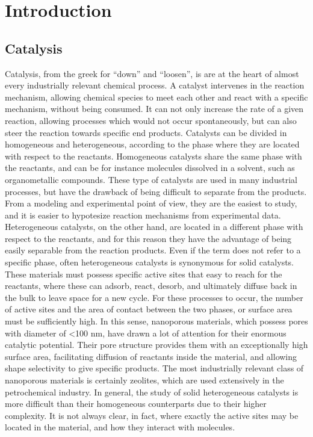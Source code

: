 \graphicspath{{figures/}}

\renewcommand\evenpagerightmark{{\scshape\small Introduction}}
\renewcommand\oddpageleftmark{{\scshape\small Chapter 1}}


\hyphenation{}

\chapter[Introduction]%
{Introduction}
\label{ch1}
\section{Catalysis}
Catalysis, from the greek for ``down'' and ``loosen'', is are at the heart of almost every industrially relevant chemical process. A catalyst intervenes in the reaction mechanism, allowing chemical species to meet each other and react with a specific mechanism, without being consumed. It can not only increase the rate of a given reaction, allowing processes which would not occur spontaneously, but can also steer the reaction towards specific end products. Catalysts can be divided in homogeneous and heterogeneous, according to the phase where they are located with respect to the reactants. Homogeneous catalysts share the same phase with the reactants, and can be for instance molecules dissolved in a solvent, such as organometallic compounds. These type of catalysts are used in many industrial processes,  but have the drawback of being difficult to separate from the products. From a modeling and experimental point of view, they are the easiest to study, and it is easier to hypotesize reaction mechanisms from experimental data. Heterogeneous catalysts, on the other hand, are located in a different phase with respect to the reactants, and for this reason they have the advantage of being easily separable from the reaction products. Even if the term does not refer to a specific phase, often heterogeneous catalysts is synonymous for solid catalysts. These materials must possess specific active sites that easy to reach for the reactants, where these can adsorb, react, desorb, and ultimately diffuse back in the bulk to leave space for a new cycle. For these processes to occur, the number of active sites and the area of contact between the two phases, or surface area must be sufficiently high. In this sense, nanoporous materials, which possess pores with diameter of <100 nm, have drawn a lot of attention for their enormous catalytic potential. Their pore structure provides them with an exceptionally high surface area, facilitating diffusion of reactants inside the material, and allowing shape selectivity to give specific products. The most industrially relevant class of nanoporous materials is certainly zeolites, which are used extensively in the petrochemical industry. In general, the study of solid heterogeneous catalysts is more difficult than their homogeneous counterparts due to their higher complexity. It is not always clear, in fact, where exactly the active sites may be located in the material, and how they interact with molecules. 

